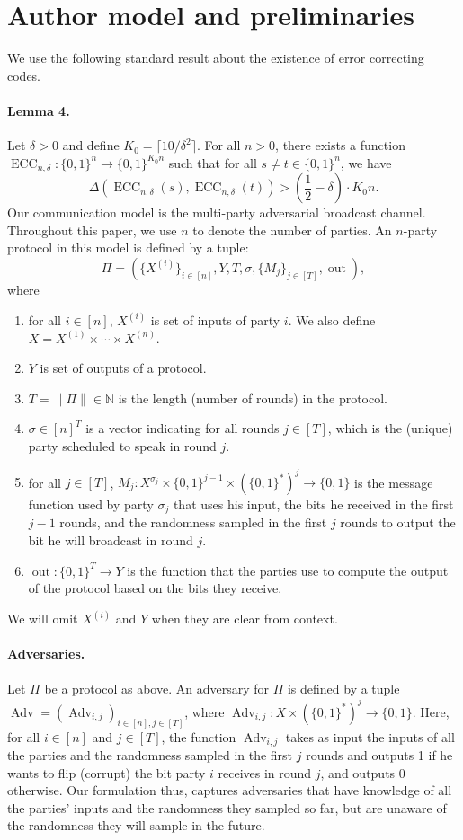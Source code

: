 \section*{Author model and preliminaries}
We use the following standard result about the existence of error correcting codes.
\paragraph{Lemma 4.} Let $\delta>0$ and define $K_0=\lceil10/\delta^2\rceil$. For all $n>0$, there exists a function $\operatorname{ECC}_{n,\delta}:\{0,1\}^n\to\{0,1\}^{K_0 n}$ such that for all $s\ne t\in\{0,1\}^n$, we have
\[\Delta(\operatorname{ECC}_{n,\delta}(s),\operatorname{ECC}_{n,\delta}(t))>\left(\frac12-\delta\right)\cdot K_0 n.\]
Our communication model is the multi-party adversarial broadcast channel. Throughout this paper, we use $n$ to denote the number of parties. An $n$-party protocol in this model is defined by a tuple:
\[\Pi=\left(\{X^{(i)}\}_{i\in[n]},Y,T,\sigma,\{M_j\}_{j\in[T]},\operatorname{out}\right),\]
where
\begin{enumerate}
\item for all $i\in[n]$, $X^{(i)}$ is set of inputs of party $i$. We also define $X=X^{(1)}\times\cdots\times X^{(n)}$.
\item $Y$ is set of outputs of a protocol.
\item $T=\|\Pi\|\in\mathbb N$ is the length (number of rounds) in the protocol.
\item $\sigma\in[n]^T$ is a vector indicating for all rounds $j\in[T]$, which is the (unique) party scheduled to speak in round $j$.
\item for all $j\in[T]$, $M_j:X^{\sigma_j}\times\{0,1\}^{j-1}\times(\{0,1\}^*)^j\to\{0,1\}$ is the message function used by party $\sigma_j$ that uses his input, the bits he received in the first $j-1$ rounds, and the randomness sampled in the first $j$ rounds to output the bit he will broadcast in round $j$.
\item $\operatorname{out}:\{0,1\}^T\to Y$ is the function that the parties use to compute the output of the protocol based on the bits they receive.
\end{enumerate}
We will omit $X^{(i)}$ and $Y$ when they are clear from context.
\paragraph{Adversaries.} Let $\Pi$ be a protocol as above. An adversary for $\Pi$ is defined by a tuple $\operatorname{Adv}=(\operatorname{Adv}_{i,j})_{i\in[n],j\in[T]}$, where $\operatorname{Adv}_{i,j}:X\times(\{0,1\}^*)^j\to\{0,1\}$. Here, for all $i\in[n]$ and $j\in[T]$, the function $\operatorname{Adv}_{i,j}$ takes as input the inputs of all the parties and the randomness sampled in the first $j$ rounds and outputs 1 if he wants to flip (corrupt) the bit party $i$ receives in round $j$, and outputs 0 otherwise. Our formulation thus, captures adversaries that have knowledge of all the parties' inputs and the randomness they sampled so far, but are unaware of the randomness they will sample in the future.
